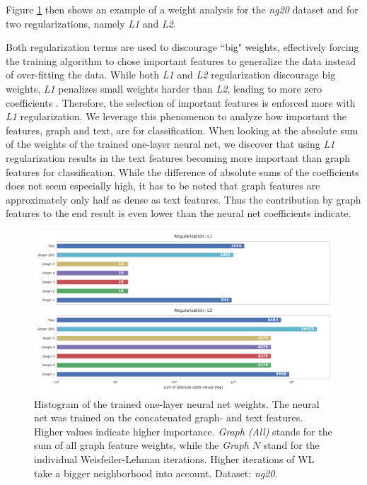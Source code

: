 Figure \ref{fig:combined_coefs_l1_l2_regularization} then shows an example of a weight analysis for the \textit{ng20} dataset and for two regularizations, namely \textit{L1} and \textit{L2}.

Both regularization terms are used to discourage ``big" weights, effectively forcing the training algorithm to chose important features to generalize the data instead of over-fitting the data.
While both \textit{L1} and \textit{L2} regularization discourage big weights, \textit{L1} penalizes small weights harder than \textit{L2}, leading to more zero coefficients \cite[p.~13]{Hastie2009}.
Therefore, the selection of important features is enforced more with \textit{L1} regularization.
We leverage this phenomenon to analyze how important the features, graph and text, are for classification.
When looking at the absolute sum of the weights of the trained one-layer neural net, we discover that using \textit{L1} regularization results in the text features becoming more important than graph features for classification.
While the difference of absolute sums of the coefficients does not seem especially high, it has to be noted that graph features are approximately only half as dense as text features.
Thus the contribution by graph features to the end result is even lower than the neural net coefficients indicate.

\begin{figure}[htb!]
	\centering
	{\includegraphics[width=\linewidth]{assets/figures/combined_coefs_l1_l2_regularization.pdf}%
		\caption[Statistics: Histogram of the trained weights of a one-layer neural net]{%
			Histogram of the trained one-layer neural net weights. The neural net was trained on the concatenated graph- and text features.
			Higher values indicate higher importance.
			\textit{Graph (All)} stands for the sum of all graph feature weights, while the \textit{Graph $N$} stand for the individual Weisfeiler-Lehman iterations.
			Higher iterations of WL take a bigger neighborhood into account.
			Dataset: \textit{ng20}.
		}%
		\label{fig:combined_coefs_l1_l2_regularization}}
\end{figure}

